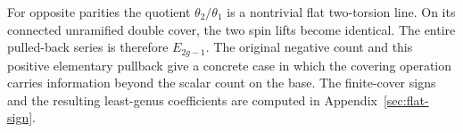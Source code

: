 For opposite parities the quotient \(\theta_2/\theta_1\) is a nontrivial flat two-torsion line. On its connected unramified double cover, the two spin lifts become identical. The entire pulled-back series is therefore \(E_{2g-1}\). The original negative count and this positive elementary pullback give a concrete case in which the covering operation carries information beyond the scalar count on the base. The finite-cover signs and the resulting least-genus coefficients are computed in Appendix~\ref{sec:flat-sign}.
